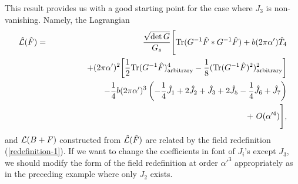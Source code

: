 \documentclass[a4paper,12pt]{article}
\begin{document}
This result provides us with a good starting point for the case
where $J_3$ is non-vanishing.
Namely, the Lagrangian
\begin{eqnarray}
\hat{{\cal L}}(\hat{F}) &=& \frac{\sqrt{\det G}}{G_s} \Biggl[
{\rm Tr} ( G^{-1} \hat{F} \ast G^{-1} \hat{F} )
+ b (2 \pi \alpha') \hat{T}_4
\nonumber \\
&& \qquad \qquad + (2 \pi \alpha')^2 \biggl[
\frac{1}{2} {\rm Tr} ( G^{-1} \hat{F} )^4_{\rm arbitrary}
-\frac{1}{8} ( {\rm Tr} ( G^{-1} \hat{F} )^2 )^2_{\rm arbitrary}
\biggr]
\nonumber \\
&& \qquad \qquad - \frac{1}{4} b (2 \pi \alpha')^3
\left( -\frac{1}{4} \hat{J}_1 + 2 \hat{J}_2 + \hat{J}_3
+2 \hat{J}_5 -\frac{1}{4} \hat{J}_6 + \hat{J}_7
\right)
\nonumber \\
&& \qquad \qquad + ~O(\alpha'^4)
\Biggr],
\label{non-vanishing-J_3}
\end{eqnarray}
and ${\cal L} (B+F)$ constructed from ${\hat{\cal L}} (\hat{F})$
are related by the field redefinition (\ref{redefinition-1}).
If we want to 
change the coefficients in font of $J_i$'s except $J_3$,
we should
modify the form of the field redefinition
at order $\alpha'^3$ appropriately
as in the preceding example where only $J_2$ exists.
\end{document}
